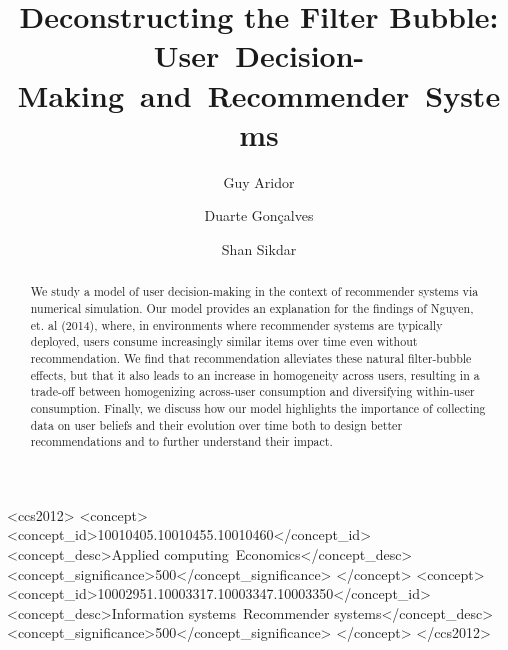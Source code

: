 \documentclass[sigconf]{acmart}
\begin{document}
\title[Deconstructing the Filter Bubble]{Deconstructing the Filter Bubble: User~Decision-Making~and~Recommender~Systems}

\author{Guy Aridor}


\author{Duarte Gon\c{c}alves}

\author{Shan Sikdar}


\begin{CCSXML}
<ccs2012>
<concept>
<concept_id>10010405.10010455.10010460</concept_id>
<concept_desc>Applied computing~Economics</concept_desc>
<concept_significance>500</concept_significance>
</concept>
<concept>
<concept_id>10002951.10003317.10003347.10003350</concept_id>
<concept_desc>Information systems~Recommender systems</concept_desc>
<concept_significance>500</concept_significance>
</concept>
</ccs2012>
\end{CCSXML}




\begin{abstract}
We study a model of user decision-making in the context of recommender systems via numerical simulation.
Our model provides an explanation for the findings of Nguyen, et. al (2014), where, in environments where recommender systems are typically deployed, users consume increasingly similar items over time even without recommendation. We find that recommendation alleviates these natural filter-bubble effects, but that it also leads to an increase in homogeneity across users, resulting in a trade-off between homogenizing across-user consumption and diversifying within-user consumption. Finally, we discuss how our model highlights the importance of collecting data on user beliefs and their evolution over time both to design better recommendations and to further understand their impact.
\end{abstract}
\maketitle
\end{document}
